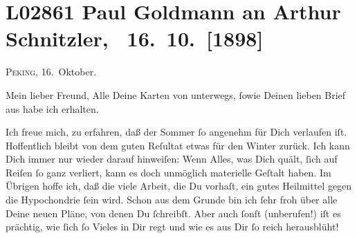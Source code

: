 

\section[ Paul Goldmann an Arthur Schnitzler, 16. 10. {[}1898{]}]{L02861 Paul Goldmann an Arthur Schnitzler,  16. 10. {[}1898{]}}
\nopagebreak{}
\rehead{ }\normalsize\beginnumbering{}
\toendnotes[C]{\smallbreak\pagebreak[2]}
\toendnotes[C]{\smallbreak}
\toendnotes[C]{\smallbreak}
\pstart
           \raggedleft{}{\pb}\textsc{Peking}, 16. Oktober.\pend
           
\pstart\center{}Mein lieber Freund,\pend\vspace{0.5em}
\pstart
           Alle Deine Karten von unterwegs,{ }ſowie Deinen lieben Brief aus \label{K_L02861-1v}\label{K_L02861-1} habe
               ich erhalten.\pend
           
\pstart
           Ich freue mich, zu erfahren, daß der Sommer{ }ſo angenehm für Dich verlaufen iſt.
               Hoffentlich bleibt von dem guten Reſultat etwas für den Winter zurück. \strikeout{\textcolor{gray}{×}} Ich kann Dich immer nur wieder darauf hinweiſen: Wenn Alles, was Dich quält,{ }ſich auf Reiſen{ }ſo ganz verliert, kann es doch unmöglich materielle Geſtalt haben. Im
               Übrigen hoffe ich, daß die viele Arbeit, die Du vorhaſt, ein gutes Heilmittel gegen
               die Hypochondrie{ }ſein wird. Schon aus dem Grunde {\pb}bin ich{ }ſehr froh über alle Deine neuen Pläne, von denen Du{ }ſchreibſt. Aber auch{ }ſonſt (unberufen!) iſt es prächtig, wie{ }ſich{ }ſo \strikeout{\textcolor{gray}{V}} Vieles in Dir regt und wie es aus Dir{ }ſo reich herausblüht!\pend
           
